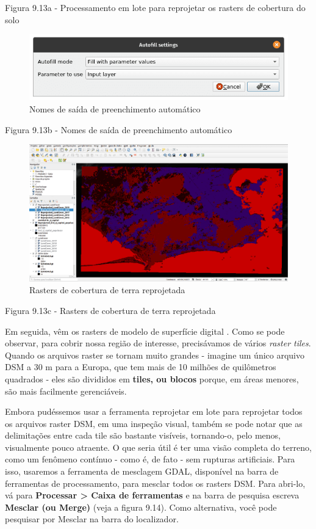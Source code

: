 \documentclass[
]{krantz}
\begin{document}
Figura 9.13a - Processamento em lote para reprojetar os rasters de cobertura do solo

\begin{figure}
\centering
\includegraphics{media/modulo9/fig913_b.png}
\caption{Nomes de saída de preenchimento automático}
\end{figure}

Figura 9.13b - Nomes de saída de preenchimento automático

\begin{figure}
\centering
\includegraphics{media/modulo9/fig913_c.png}
\caption{Rasters de cobertura de terra reprojetada}
\end{figure}

Figura 9.13c - Rasters de cobertura de terra reprojetada

Em seguida, vêm os rasters de modelo de superfície digital . Como se pode observar, para cobrir nossa região de interesse, precisávamos de vários \emph{raster tiles}. Quando os arquivos raster se tornam muito grandes - imagine um único arquivo DSM a 30 m para a Europa, que tem mais de 10 milhões de quilômetros quadrados - eles são divididos em \textbf{tiles, ou blocos} porque, em áreas menores, são mais facilmente gerenciáveis.

Embora pudéssemos usar a ferramenta reprojetar em lote para reprojetar todos os arquivos raster DSM, em uma inspeção visual, também se pode notar que as delimitações entre cada tile são bastante visíveis, tornando-o, pelo menos, visualmente pouco atraente. O que seria útil é ter uma visão completa do terreno, como um fenômeno contínuo - como é, de fato - sem rupturas artificiais. Para isso, usaremos a ferramenta de mesclagem GDAL, disponível na barra de ferramentas de processamento, para mesclar todos os rasters DSM. Para abri-lo, vá para \textbf{Processar \textgreater{} Caixa de ferramentas } e na barra de pesquisa escreva \textbf{Mesclar (ou Merge)} (veja a figura 9.14). Como alternativa, você pode pesquisar por Mesclar na barra do localizador.
\end{document}
